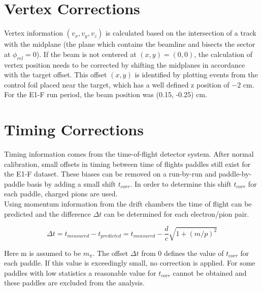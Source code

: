 \section{Vertex Corrections}
Vertex information $(v_x, v_y, v_z)$ is calculated based on the intersection of a track with the midplane (the plane which contains the beamline and bisects the sector at $\phi_{rel} = 0$).  If the beam is not centered at $(x,y)=(0,0)$, the calculation of vertex position needs to be corrected by shifting the midplanes in accordance with the target offset.  This offset $(x,y)$ is identified by plotting events from the control foil placed near the target, which has a well defined z position of $-2$ cm. \\
      
For the E1-F run period, the beam position was (0.15, -0.25) cm.  


\section{Timing Corrections}
Timing information comes from the time-of-flight detector system.  After normal calibration, small offsets in timing between time of flights paddles still exist for the E1-F dataset.  These biases can be removed on a run-by-run and paddle-by-paddle basis by adding a small shift $t_{corr}$.  In order to determine this shift $t_{corr}$ for each paddle, charged pions are used.  \\

Using momentum information from the drift chambers the time of flight can be predicted and the difference $\Delta t$ can be determined for each electron/pion pair. 

\begin{equation}
	\Delta t = t_{measured} - t_{predicted} = t_{measured} - \frac{d}{c} \sqrt{1+(m/p)^2} 
\end{equation} 

Here m is assumed to be $m_{\pi}$.  The offset $\Delta t$ from 0 defines the value of $t_{corr}$ for each paddle.  If this value is exceedingly small, no correction is applied.  For some paddles with low statistics a reasonable value for $t_{corr}$ cannot be obtained and these paddles are excluded from the analysis.  \\

